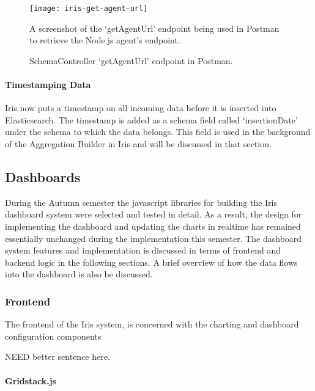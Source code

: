 \documentclass[12pt,a4paper,titlepage]{report}
\begin{document}
\begin{figure}[H]
\begin{tcolorbox}
\begin{center}
\texttt{[image: iris-get-agent-url]}
\end{center}
A screenshot of the `getAgentUrl' endpoint being used in Postman to retrieve the Node.js agent's endpoint.
\end{tcolorbox}
\caption{SchemaController `getAgentUrl' endpoint in Postman.}
\end{figure}

\paragraph{Timestamping Data}
Iris now puts a timestamp on all incoming data before it is inserted into Elasticsearch. The timestamp is added as a schema field called `insertionDate' under the schema to which the data belongs. This field is used in the background of the Aggregation Builder in Iris and will be discussed in that section.

\subsection{Dashboards}

During the Autumn semester the javascript libraries for building the Iris dashboard system were selected and tested in detail. As a result, the design for implementing the dashboard and updating the charts in realtime has remained essentially  unchanged during the implementation this semester. The dashboard system features and implementation is discussed in terms of frontend and backend logic in the following sections. A brief overview of how the data flows into the dashboard is also be discussed.
 
\subsubsection{Frontend}


The frontend of the Iris system, is concerned with the charting and dashboard configuration components

NEED better sentence here.


\paragraph{Gridstack.js}
\end{document}

